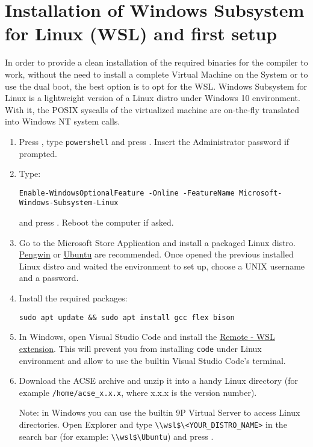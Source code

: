 \documentclass{article}
\begin{document}
\section{Installation of Windows Subsystem for Linux (WSL) and first setup}
In order to provide a clean installation of the required binaries for the compiler to work, without the need to install 
a complete Virtual Machine on the System or to use the dual boot, the best option is to opt for
the WSL. Windows Subsystem for Linux is a lightweight version of a Linux distro under Windows 10 environment.
With it, the POSIX syscalls of the virtualized machine are on-the-fly translated into Windows NT system calls.
\begin{enumerate}
    \item Press , type \verb'powershell' and press \keys{\ctrl + \shift + \enter}. Insert the Administrator password if prompted.
    \item Type: 
    \begin{scriptsize}{\begin{verbatim}Enable-WindowsOptionalFeature -Online -FeatureName Microsoft-Windows-Subsystem-Linux\end{verbatim}}\end{scriptsize}
    and press \keys{\enter}. Reboot the computer if asked.
    \item Go to the Microsoft Store Application and install a packaged Linux distro. \href{https://www.microsoft.com/it-it/p/pengwin/9nv1gv1pxz6p}{Pengwin} or \href{https://www.microsoft.com/it-it/p/ubuntu/9nblggh4msv6}{Ubuntu} are recommended.
    Once opened the previous installed Linux distro and waited the environment to set up, choose a UNIX username and a password.
    \item Install the required packages: 
    \begin{verbatim}sudo apt update && sudo apt install gcc flex bison\end{verbatim}
    \item In Windows, open Visual Studio Code and install the \href{https://marketplace.visualstudio.com/items?itemName=ms-vscode-remote.remote-wsl}{Remote - WSL extension}. This will prevent you from installing \verb+code+ under Linux environment and allow to use the builtin Visual Studio Code's terminal.
    \item Download the ACSE archive and unzip it into a handy Linux directory (for example \verb+/home/acse_x.x.x+, where x.x.x is the version number). \newline \newline \begin{small} Note: in Windows you can use the builtin 9P Virtual Server to access Linux directories. Open Explorer and type \verb+\\wsl$\<YOUR_DISTRO_NAME>+ in the search bar (for example: \verb+\\wsl$\Ubuntu+) and press \keys{\enter}.\end{small}

\end{enumerate}
\end{document}
